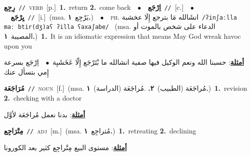 \documentclass[10pt,a4paper,twoside]{article} %
\begin{document}
\begin{multicols}{2}
{\setlength\topsep{0pt}\textbf{\foreignlanguage{arabic}{رِجِع}}\ {\color{gray}\texttt{//}\color{black}}\ \textsc{verb}\ [p.]\ \textbf{1.}~return  \textbf{2.}~come back\ \ $\bullet$\ \ \setlength\topsep{0pt}\textbf{\foreignlanguage{arabic}{اِرْجَع}}\ {\color{gray}\texttt{//}\color{black}}\ [c.]\ \ $\bullet$\ \ \setlength\topsep{0pt}\textbf{\foreignlanguage{arabic}{يِرْجَع}}\ {\color{gray}\texttt{//}\color{black}}\ [i.]\ \color{gray}(msa. \foreignlanguage{arabic}{يَرْجِع}~\foreignlanguage{arabic}{\textbf{١.}})\color{black}\ \ $\bullet$\ \ \textsc{ph.} \color{gray} \foreignlanguage{arabic}{انشَالله مَا بترجع إِلَا عخشبة}\color{black}\ {\color{gray}\texttt{/{\sffamily ʔinʃaːlla maː btir(dʒ)aʕ ʔilla ʕaxaʃabe}/}\color{black}}\ \color{gray} (msa. \foreignlanguage{arabic}{الدعاء على شخص بالموت أو المصيبة}~\foreignlanguage{arabic}{\textbf{١.}})\color{black}\ \textbf{1.}~It is an idiomatic expression that means May God wreak havoc upon you\  \begin{flushright}\color{gray}\foreignlanguage{arabic}{\textbf{\underline{\foreignlanguage{arabic}{أمثلة}}}: حسبنا الله ونعم الوكيل فيها صفية انشالله ما بْتَرْجَع إِلّا عَخَشَبِة\ $\bullet$\ \  اِرْجَع بسرعة إِمي بتسأل عنك}\end{flushright}\color{black}} \vspace{2mm}

{\setlength\topsep{0pt}\textbf{\foreignlanguage{arabic}{مُرَاجَعَة}}\ {\color{gray}\texttt{//}\color{black}}\ \textsc{noun}\ [f.]\ \color{gray}(msa. \foreignlanguage{arabic}{مُراجَعَة (الطبيب)}~\foreignlanguage{arabic}{\textbf{٢.}}  .\foreignlanguage{arabic}{مُراجَعَة (الدراسة)}~\foreignlanguage{arabic}{\textbf{١.}})\color{black}\ \textbf{1.}~revision  \textbf{2.}~checking with a doctor\  \begin{flushright}\color{gray}\foreignlanguage{arabic}{\textbf{\underline{\foreignlanguage{arabic}{أمثلة}}}: بدنا نعمل مُراجَعَة لأوَّل}\end{flushright}\color{black}} \vspace{2mm}

{\setlength\topsep{0pt}\textbf{\foreignlanguage{arabic}{مِتْرَاجِع}}\ {\color{gray}\texttt{//}\color{black}}\ \textsc{adj}\ [m.]\ \color{gray}(msa. \foreignlanguage{arabic}{مُتراجِع}~\foreignlanguage{arabic}{\textbf{١.}})\color{black}\ \textbf{1.}~retreating  \textbf{2.}~declining\  \begin{flushright}\color{gray}\foreignlanguage{arabic}{\textbf{\underline{\foreignlanguage{arabic}{أمثلة}}}: مستوى البيع مِتْراجِع كثير بعد الكورونا}\end{flushright}\color{black}} \vspace{2mm}


\end{multicols}
\end{document}
